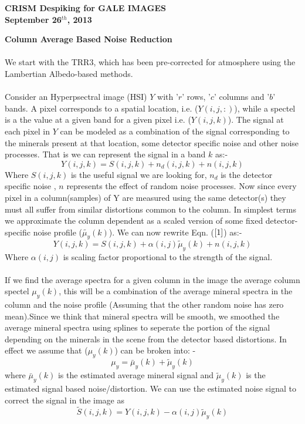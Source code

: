 \documentclass[pdftex, 12pt,a4paper,oneside]{report}
\begin{document}
\begin{center}
\noindent\makebox[\linewidth]{\rule{\textwidth}{1pt}}
\textbf{CRISM Despiking for GALE IMAGES}\\
\textbf{September 26$^{th}$, 2013}
\noindent\makebox[\linewidth]{\rule{\textwidth}{1pt}}
\end{center}

\textbf{Column Average Based Noise Reduction}\\
\\We start with the TRR3, which has been pre-corrected for atmosphere using the Lambertian Albedo-based methods.\\ 
\\Consider an Hyperpsectral image (HSI) $Y$ with '$r$' rows, '$c$' columns and '$b$' bands. A pixel corresponds to a spatial location, i.e. ($Y(i,j,:)$), while a spectel is a the value at a given band for a given pixel i.e. ($Y(i,j,k)$). The signal at each pixel in $Y$ can be modeled as a combination of the signal corresponding to the minerals present at that location, some detector specific noise and other noise processes. That is we can represent the signal in a band $k$ as:- 
\begin{equation}
Y(i,j,k) = S(i,j,k) + n_d(i,j,k) + n(i,j,k)
\label{1}
\end{equation}
Where $S(i,j,k)$ is the useful signal we are looking for, $n_d$ is the detector specific noise , $n$ represents the effect of random noise processes. Now since every pixel in a column(samples) of Y are measured using the same detector(s) they must all suffer from similar distortions common to the column. In simplest terms we approximate the column dependent as a scaled version of some fixed detector-specific noise profile ($\tilde{\mu_{y}}(k)$). We can now rewrite Eqn. ($\ref{1}$) as:- 
\begin{equation}
Y(i,j,k) = S(i,j,k) + \alpha(i,j)\tilde{\mu}_y(k) + n(i,j,k)
\label{2}
\end{equation}
Where $\alpha(i,j)$ is scaling factor proportional to the strength of the signal. \\
\\If we find the average spectra for a given column  in the image the average column spectel $\mu_y (k)$, this will be a combination of the average mineral spectra in the column and the noise profile (Assuming that the other random noise has zero mean).Since we think that mineral spectra will be smooth, we smoothed the average mineral spectra using splines to seperate the portion of the signal depending on the minerals in the scene from the detector based distortions. In effect we assume that ($\mu_{y}(k)$) can be broken into: -
\begin{equation}
\mu_{y} = \bar{\mu}_y (k) + \tilde{\mu}_y (k)
\label{3}
\end{equation}
where $\bar{\mu}_y (k)$ is the estimated average mineral signal and $\tilde{\mu}_y (k)$  is the estimated signal based noise/distortion. We can use the estimated noise signal to correct the signal in the image as
\begin{equation}
\tilde{S}(i,j,k) = Y(i,j,k) - \alpha(i,j) \tilde{\mu}_y (k)
\label{4}
\end{equation}
\end{document}
